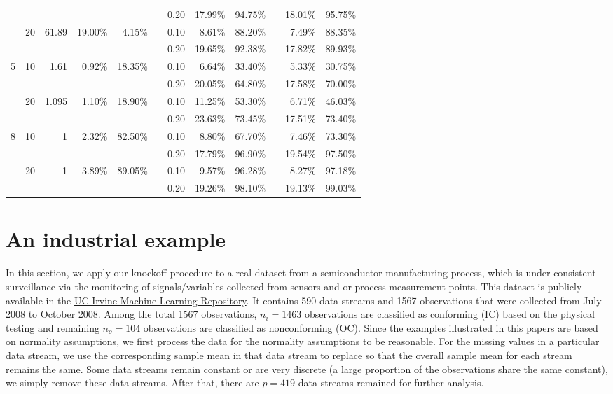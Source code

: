 \documentclass[a4paper,12pt]{article}
\begin{document}
\begin{table}[htbp]
\begin{tabular}{ccrrrrrrrrrr}
      &   &   &   &   &   &             0.20  & 17.99\% & 94.75\% &   & 18.01\% & 95.75\% \\
      & 20 &           61.89  & 19.00\% & 4.15\% &   &             0.10  & 8.61\% & 88.20\% &   & 7.49\% & 88.35\% \\
      &   &   &   &   &   &             0.20  & 19.65\% & 92.38\% &   & 17.82\% & 89.93\% \\
    5 & 10 & 1.61 & 0.92\% & 18.35\% &   &             0.10  & 6.64\% & 33.40\% &   & 5.33\% & 30.75\% \\
      &   &   &   &   &   &             0.20  & 20.05\% & 64.80\% &   & 17.58\% & 70.00\% \\
      & 20 & 1.095 & 1.10\% & 18.90\% &   &             0.10  & 11.25\% & 53.30\% &   & 6.71\% & 46.03\% \\
      &   &   &   &   &   &             0.20  & 23.63\% & 73.45\% &   & 17.51\% & 73.40\% \\
    8 & 10 & 1 & 2.32\% & 82.50\% &   &             0.10  & 8.80\% & 67.70\% &   & 7.46\% & 73.30\% \\
      &   &   &   &   &   &             0.20  & 17.79\% & 96.90\% &   & 19.54\% & 97.50\% \\
      & 20 & 1 & 3.89\% & 89.05\% &   &             0.10  & 9.57\% & 96.28\% &   & 8.27\% & 97.18\% \\
      &   &   &   &   &   &             0.20  & 19.26\% & 98.10\% &   & 19.13\% & 99.03\% \\
      \midrule
    \end{tabular}%
  \label{tab:addlabel}%
\end{table}%

\section{An industrial example}


In this section, we apply our knockoff procedure to a real dataset from a semiconductor manufacturing process, which is under consistent surveillance via the monitoring of signals/variables collected from sensors and or process measurement points. This dataset is publicly available in the \href{http://archive.ics.uci.edu/ml/datasets/SECOM}{UC Irvine Machine Learning Repository}. It contains 590 data streams and 1567 observations that were collected from July 2008 to October 2008. Among the total 1567 observations, $n_i=1463$ observations are classified as conforming (IC) based on the physical testing and remaining $n_o=104$ observations are classified as nonconforming (OC). Since the examples illustrated in this papers are based on normality assumptions, we first process the data for the normality assumptions to be reasonable. For the missing values in a particular data stream, we use the corresponding sample mean in that data stream to replace so that the overall sample mean for each stream remains the same. Some data streams remain constant or are very discrete (a large proportion of the observations share the same constant), we simply remove these data streams. After that, there are $p=419$ data streams remained for further analysis. 
\end{document}
